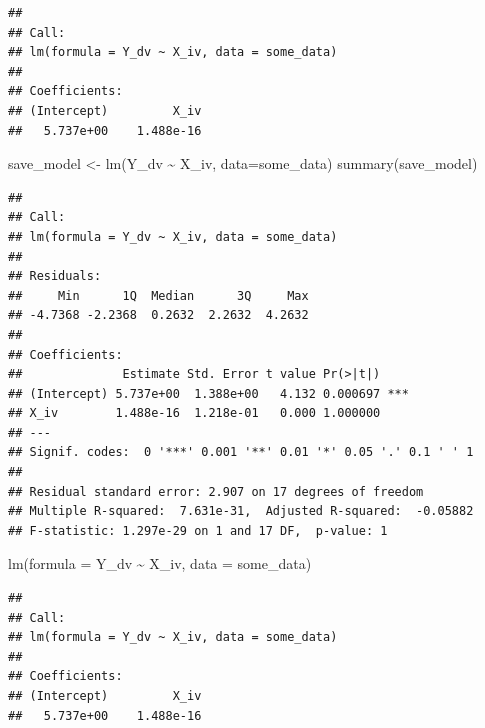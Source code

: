 \documentclass[
  english,
  man]{article}
\newenvironment{Shaded}{\begin{snugshade}}{\end{snugshade}}
\newcommand{\AttributeTok}[1]{\textcolor[rgb]{0.77,0.63,0.00}{#1}}
\newcommand{\FunctionTok}[1]{\textcolor[rgb]{0.00,0.00,0.00}{#1}}
\newcommand{\NormalTok}[1]{#1}
\newcommand{\OtherTok}[1]{\textcolor[rgb]{0.56,0.35,0.01}{#1}}
\newcommand{\SpecialCharTok}[1]{\textcolor[rgb]{0.00,0.00,0.00}{#1}}
\begin{document}
\begin{verbatim}
## 
## Call:
## lm(formula = Y_dv ~ X_iv, data = some_data)
## 
## Coefficients:
## (Intercept)         X_iv  
##   5.737e+00    1.488e-16
\end{verbatim}

\begin{Shaded}
\begin{Highlighting}[]
\NormalTok{save\_model }\OtherTok{\textless{}{-}} \FunctionTok{lm}\NormalTok{(Y\_dv }\SpecialCharTok{\textasciitilde{}}\NormalTok{ X\_iv, }\AttributeTok{data=}\NormalTok{some\_data)}
\FunctionTok{summary}\NormalTok{(save\_model)}
\end{Highlighting}
\end{Shaded}

\begin{verbatim}
## 
## Call:
## lm(formula = Y_dv ~ X_iv, data = some_data)
## 
## Residuals:
##     Min      1Q  Median      3Q     Max 
## -4.7368 -2.2368  0.2632  2.2632  4.2632 
## 
## Coefficients:
##              Estimate Std. Error t value Pr(>|t|)    
## (Intercept) 5.737e+00  1.388e+00   4.132 0.000697 ***
## X_iv        1.488e-16  1.218e-01   0.000 1.000000    
## ---
## Signif. codes:  0 '***' 0.001 '**' 0.01 '*' 0.05 '.' 0.1 ' ' 1
## 
## Residual standard error: 2.907 on 17 degrees of freedom
## Multiple R-squared:  7.631e-31,  Adjusted R-squared:  -0.05882 
## F-statistic: 1.297e-29 on 1 and 17 DF,  p-value: 1
\end{verbatim}

\begin{Shaded}
\begin{Highlighting}[]
\FunctionTok{lm}\NormalTok{(}\AttributeTok{formula =}\NormalTok{ Y\_dv }\SpecialCharTok{\textasciitilde{}}\NormalTok{ X\_iv, }\AttributeTok{data =}\NormalTok{ some\_data)}
\end{Highlighting}
\end{Shaded}

\begin{verbatim}
## 
## Call:
## lm(formula = Y_dv ~ X_iv, data = some_data)
## 
## Coefficients:
## (Intercept)         X_iv  
##   5.737e+00    1.488e-16
\end{verbatim}

\begin{Shaded}
\end{Shaded}
\end{document}
